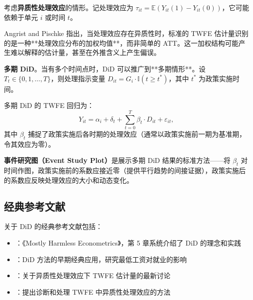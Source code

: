 考虑\textbf{异质性处理效应}的情形。记处理效应为 $\tau_{it} = \mathbb{E}(Y_{it}(1) - Y_{it}(0))$，它可能依赖于单元 $i$ 或时间 $t$。

Angrist and Pischke \citep{AngristPischke:2009} 指出，当处理效应存在异质性时，标准的 TWFE 估计量识别的是一种**处理效应分布的加权均值**，而非简单的 ATT。这一加权结构可能产生难以解释的估计量，甚至在外推含义上产生偏误。

\fboxsep=6pt\fboxrule=1pt
\noindent{}

\textbf{多期 DiD}。当有多个时间点时，DiD 可以推广到**多期情形**。设 $T_t \in \{0, 1, \dots, T\}$，则处理指示变量 $D_{it} = G_i \cdot \mathbb{I}(t \geq t^*)$，其中 $t^*$ 为政策实施时间。

多期 DiD 的 TWFE 回归为：
\[
Y_{it} = \alpha_i + \delta_t + \sum_{t=0}^T \beta_t \cdot D_{it} + \varepsilon_{it},
\label{eq:appendix-did-multi}
\]
其中 $\beta_t$ 捕捉了政策实施后各时期的处理效应（通常以政策实施前一期为基准期，令其效应为零）。

\textbf{事件研究图（Event Study Plot）}是展示多期 DiD 结果的标准方法——将 $\beta_t$ 对时间作图，政策实施前的系数应接近零（提供平行趋势的间接证据），政策实施后的系数应反映处理效应的大小和动态变化。

\subsection{经典参考文献}\label{sec:appendix-did-refs}

关于 DiD 的经典参考文献包括：
\begin{itemize}
  \item \cite{AngristPischke:2009}：《Mostly Harmless Econometrics》，第 5 章系统介绍了 DiD 的理念和实践
  \item \cite{CardKruger:1994}：DiD 方法的早期经典应用，研究最低工资对就业的影响
  \item \cite{GoodmanBacon:2021}：关于异质性处理效应下 TWFE 估计量的最新讨论
  \item \cite{DeChaisemartinDHaul:2020}：提出诊断和处理 TWFE 中异质性处理效应的方法
\end{itemize}
